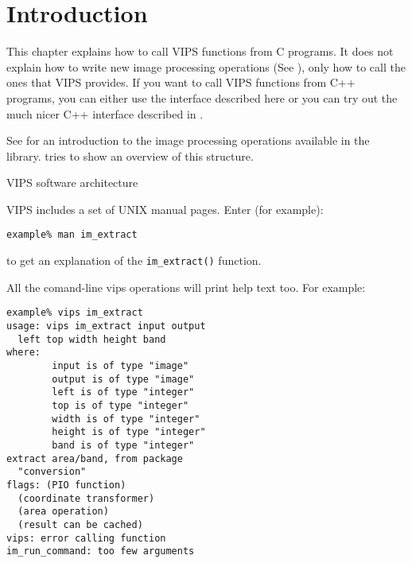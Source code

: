 \section{Introduction}

This chapter explains how to call VIPS functions from C programs. It does not
explain how to write new image processing operations (See ),
only how to call the ones that VIPS provides. If you want to call VIPS
functions from C++ programs, you can either use the interface described here
or you can try out the much nicer C++ interface described in .

See  for an introduction to the image processing operations
available in the library.  tries to show
an overview of this structure.

\begin{fig2}
\caption{VIPS software architecture}
\label{fg:architecture}
\end{fig2}

VIPS includes a set of UNIX manual pages. Enter (for example):

\begin{verbatim}
example% man im_extract
\end{verbatim}

\noindent
to get an explanation of the \verb+im_extract()+ function.

All the comand-line vips operations will print help text too. For example:

\begin{verbatim}
example% vips im_extract
usage: vips im_extract input output 
  left top width height band
where:
        input is of type "image"
        output is of type "image"
        left is of type "integer"
        top is of type "integer"
        width is of type "integer"
        height is of type "integer"
        band is of type "integer"
extract area/band, from package 
  "conversion"
flags: (PIO function) 
  (coordinate transformer) 
  (area operation) 
  (result can be cached)
vips: error calling function
im_run_command: too few arguments
\end{verbatim}
